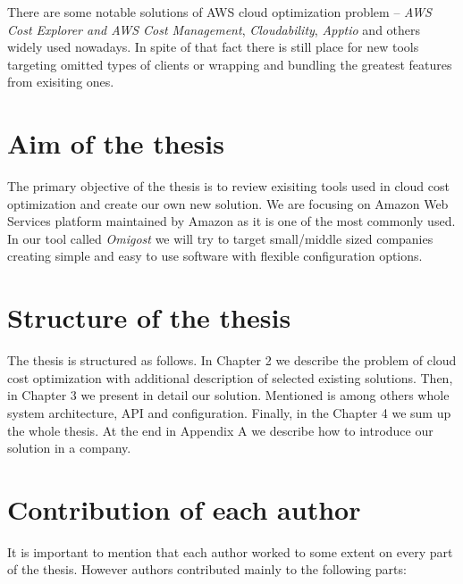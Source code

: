 \documentclass[licencjacka,en]{thesisclass}
\begin{document}
        There are some notable solutions of AWS cloud optimization problem -- \textit{AWS Cost Explorer and AWS Cost Management}, \textit{Cloudability}, \textit{Apptio} and others widely used nowadays. In spite of that fact there is still place for new tools targeting omitted types of clients or wrapping and bundling the greatest features from exisiting ones.

    \section{Aim of the thesis}

        The primary objective of the thesis is to review exisiting tools used in cloud cost optimization and create our own new solution. We are focusing on Amazon Web Services platform maintained by Amazon as it is one of the most commonly used.
        In our tool called \textit{Omigost} we will try to target small/middle sized companies creating simple and easy to use software with flexible configuration options.

    \section{Structure of the thesis}

        The thesis is structured as follows. In Chapter 2 we describe the problem of cloud cost optimization with additional description of selected existing solutions. Then, in Chapter 3 we present in detail our solution. Mentioned is among others whole system architecture, API and configuration. Finally, in the Chapter 4 we sum up the whole thesis. At the end in Appendix A we describe how to introduce our solution in a company.

    \section{Contribution of each author}

      It is important to mention that each author worked to some extent on every part of the thesis. However authors contributed mainly to the following parts:
\end{document}
